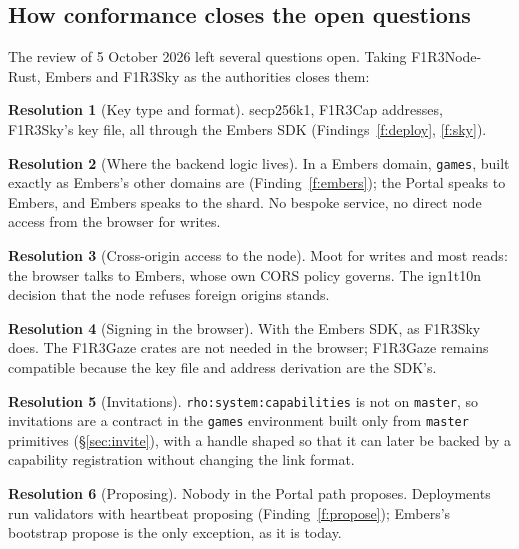 \documentclass[11pt]{article}
\theoremstyle{definition}
\newtheorem{resolution}{Resolution}
\theoremstyle{remark}
\newcommand{\code}[1]{\texttt{#1}}
\newcommand{\Nd}{F1R3Node-Rust}
\newcommand{\Em}{Embers}
\newcommand{\Sky}{F1R3Sky}
\newcommand{\Gz}{F1R3Gaze}
\begin{document}
\subsection{How conformance closes the open questions}

The review of 5 October 2026 left several questions open. Taking \Nd{}, \Em{} and
\Sky{} as the authorities closes them:

\begin{resolution}[Key type and format]
secp256k1, F1R3Cap addresses, \Sky{}'s key file, all through the \Em{} SDK
(Findings~\ref{f:deploy}, \ref{f:sky}).
\end{resolution}

\begin{resolution}[Where the backend logic lives]
In a \Em{} domain, \code{games}, built exactly as \Em{}'s other domains are
(Finding~\ref{f:embers}); the Portal speaks to \Em{}, and \Em{} speaks to the shard.
No bespoke service, no direct node access from the browser for writes.
\end{resolution}

\begin{resolution}[Cross-origin access to the node]
Moot for writes and most reads: the browser talks to \Em{}, whose own CORS policy
governs. The ign1t10n decision that the node refuses foreign origins stands.
\end{resolution}

\begin{resolution}[Signing in the browser]
With the \Em{} SDK, as \Sky{} does. The \Gz{} crates are not needed in the browser;
\Gz{} remains compatible because the key file and address derivation are the
SDK's.
\end{resolution}

\begin{resolution}[Invitations]
\code{rho:system:capabilities} is not on \code{master}, so invitations are a contract
in the \code{games} environment built only from \code{master} primitives
(\S\ref{sec:invite}), with a handle shaped so that it can later be backed by a
capability registration without changing the link format.
\end{resolution}

\begin{resolution}[Proposing]
Nobody in the Portal path proposes. Deployments run validators with heartbeat
proposing (Finding~\ref{f:propose}); \Em{}'s bootstrap propose is the only
exception, as it is today.
\end{resolution}
\end{document}

